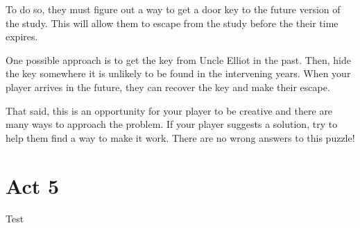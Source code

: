 \documentclass[a6paper, parskip=half, DIV=14, 12pt]{scrartcl}
\begin{document}
To do so, they must figure out a way to get a door key to the future version of the study.
This will allow them to escape from the study before the their time expires.

One possible approach is to get the key from Uncle Elliot in the past. Then, hide the key somewhere it is unlikely to be found in the intervening years. When your player arrives in the future, they can recover the key and make their escape.

That said, this is an opportunity for your player to be creative and there are many ways to approach the problem. If your player suggests a solution, try to help them find a way to make it work. There are no wrong answers to this puzzle!

\newpage

\section*{Act 5}
Test
\end{document}
